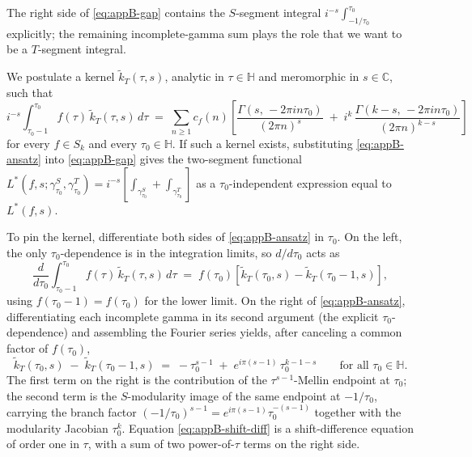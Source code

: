 \documentclass[11pt]{article}
\numberwithin{equation}{section}  %
\newcommand{\HH}{\mathbb{H}}
\newcommand{\CC}{\mathbb{C}}
\begin{document}
The right side of \eqref{eq:appB-gap} contains the $S$-segment integral
$i^{-s}\int_{-1/\tau_0}^{\tau_0}$ explicitly; the remaining
incomplete-gamma sum plays the role that we want to be a $T$-segment
integral.

We postulate a kernel $\widetilde{k}_T(\tau, s)$,
analytic in $\tau \in \HH$ and meromorphic in $s \in \CC$, such that
\begin{equation}\label{eq:appB-ansatz}
  i^{-s}\!\int_{\tau_0-1}^{\tau_0}\! f(\tau)\,\widetilde{k}_T(\tau, s)\,d\tau
  \;=\; \sum_{n \ge 1} c_f(n)\!
  \left[\frac{\Gamma(s,\,-2\pi i n \tau_0)}{(2\pi n)^s}
  \;+\; i^k\,\frac{\Gamma(k - s,\,-2\pi i n \tau_0)}{(2\pi n)^{k - s}}\right]
\end{equation}
for every $f \in S_k$ and every $\tau_0 \in \HH$.  If such a kernel
exists, substituting \eqref{eq:appB-ansatz} into \eqref{eq:appB-gap}
gives the two-segment functional
$L^*(f, s; \gamma^S_{\tau_0}, \gamma^T_{\tau_0}) = i^{-s}[\int_{\gamma^S_{\tau_0}} +
\int_{\gamma^T_{\tau_0}}]$ as a $\tau_0$-independent expression equal to
$L^*(f, s)$.

To pin the kernel, differentiate both sides of \eqref{eq:appB-ansatz} in $\tau_0$.  On the
left, the only $\tau_0$-dependence is in the integration limits, so
$d/d\tau_0$ acts as
\begin{equation}
  \frac{d}{d\tau_0}\!\int_{\tau_0-1}^{\tau_0}\! f(\tau)\,\widetilde{k}_T(\tau, s)\,d\tau
  \;=\; f(\tau_0)\!\left[\widetilde{k}_T(\tau_0, s)
  - \widetilde{k}_T(\tau_0 - 1, s)\right],
\end{equation}
using $f(\tau_0 - 1) = f(\tau_0)$ for the lower limit.  On the right
of \eqref{eq:appB-ansatz}, differentiating each incomplete gamma in
its second argument (the explicit $\tau_0$-dependence) and assembling
the Fourier series yields, after canceling a common factor of
$f(\tau_0)$,
\begin{equation}\label{eq:appB-shift-diff}
  \widetilde{k}_T(\tau_0, s) \;-\; \widetilde{k}_T(\tau_0 - 1, s)
  \;=\; -\tau_0^{s-1} \;+\; e^{i\pi(s-1)}\,\tau_0^{k - 1 - s}
  \qquad \text{for all } \tau_0 \in \HH.
\end{equation}
The first term on the right is the contribution of the
$\tau^{s-1}$-Mellin endpoint at $\tau_0$; the second term is the
$S$-modularity image of the same endpoint at $-1/\tau_0$, carrying
the branch factor $(-1/\tau_0)^{s-1} = e^{i\pi(s-1)}\tau_0^{-(s-1)}$
together with the modularity Jacobian $\tau_0^k$.  Equation
\eqref{eq:appB-shift-diff} is a shift-difference equation of order
one in $\tau$, with a sum of two power-of-$\tau$ terms on the right
side.
\end{document}
